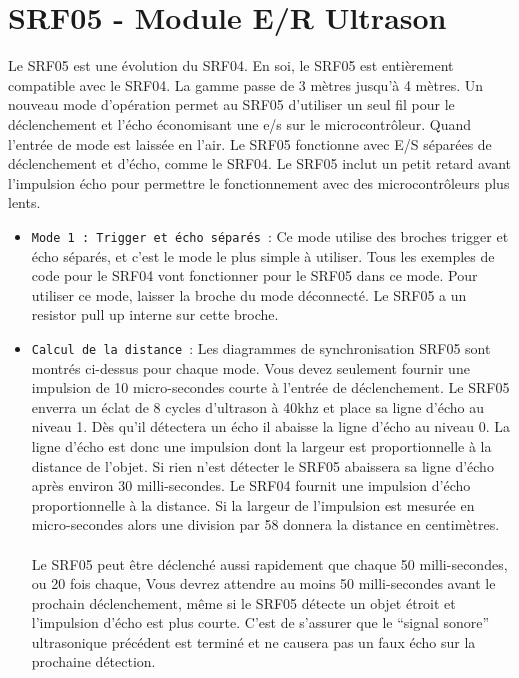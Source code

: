 \documentclass[a4paper, 12pt]{book}
\begin{document}
\chapter{SRF05 - Module E/R Ultrason}
Le SRF05 est une évolution du SRF04. En soi, le SRF05 est entièrement compatible avec le SRF04. La gamme passe de 3 mètres jusqu’à 4 mètres. Un nouveau mode d’opération permet au SRF05 d’utiliser un seul fil pour le déclenchement et l’écho économisant une e/s sur le microcontrôleur. Quand l’entrée de mode est laissée en l’air. Le SRF05 fonctionne avec E/S séparées de déclenchement et d’écho, comme le SRF04. Le SRF05 inclut un petit retard avant l’impulsion écho pour permettre le fonctionnement avec des microcontrôleurs plus lents.\\
\begin{itemize}
\item \texttt{Mode 1 : Trigger et écho séparés}~:
Ce mode utilise des broches trigger et écho séparés, et c’est le mode le plus simple à utiliser. Tous les exemples de code pour le SRF04 vont fonctionner pour le SRF05 dans ce mode. Pour utiliser ce mode, laisser la broche du mode déconnecté. Le SRF05 a un resistor pull up interne sur cette broche.\\
\item \texttt{Calcul de la distance}~:
Les diagrammes de synchronisation SRF05 sont montrés ci-dessus pour chaque mode. Vous devez seulement fournir une impulsion de 10 micro-secondes courte à l’entrée de déclenchement. Le SRF05 enverra un éclat de 8 cycles d’ultrason à 40khz et place sa ligne d’écho au niveau 1. Dès qu’il détectera un écho il abaisse la ligne d’écho au niveau 0. La ligne d’écho est donc une impulsion dont la largeur est proportionnelle à la distance de l’objet. Si rien n’est détecter le SRF05 abaissera sa ligne d’écho après environ 30 milli-secondes. Le SRF04 fournit une impulsion d’écho proportionnelle à la distance. Si la largeur de l’impulsion est mesurée en micro-secondes alors une division par 58 donnera la distance en centimètres.\\\\
Le SRF05 peut être déclenché aussi rapidement que chaque 50 milli-secondes, ou 20 fois chaque, Vous devrez attendre au moins 50 milli-secondes avant le prochain déclenchement, même si le SRF05 détecte un objet étroit et l’impulsion d’écho est plus courte. C’est de s’assurer que le “signal sonore” ultrasonique précédent est terminé et ne causera pas un faux écho sur la prochaine détection.
\end{itemize}
\end{document}
